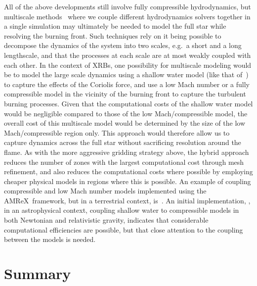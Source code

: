 \documentclass[a4paper]{jpconf}
\newcommand{\amrex}{{\sffamily AMReX}}
\newcommand{\MarginPar}[1]{\marginpar{\vskip-\baselineskip\raggedright\tiny\sffamily\hrule\smallskip{\color{red}#1}\par\smallskip\hrule}}
\begin{document}
All of the above developments still involve fully compressible
hydrodynamics, but multiscale methods~\cite{weinan2011principles} where we couple different hydrodynamics
solvers together in a single simulation may ultimately be needed to model the full star while resolving the burning front.
Such techniques rely on it being possible to decompose the dynamics of the system
into two scales, e.g.~a short and a long lengthscale, and that the processes at each
scale are at most weakly coupled with each other. In the context of XRBs, one possibility for
multiscale modeling would be to model the large scale dynamics using a shallow water model
(like that of~\cite{SPIT_ETAL02}) to capture the effects of the Coriolis force, and use
a low Mach number or
a fully compressible model in the vicinity of the burning front to capture
the turbulent burning processes. Given that the computational costs of the shallow water model
would be negligible compared to those of the low Mach/compressible model, the overall cost of
this multiscale model would be determined by the size of the low Mach/compressible region only. This
approach would therefore allow us to capture dynamics across the full star
without sacrificing resolution around the flame.
As with the more aggressive gridding strategy above, the hybrid approach
reduces the number of zones with the largest computational cost through mesh
refinement, and also reduces the computational costs where possible by
employing cheaper physical models in regions where this is possible.
An example of coupling compressible and low Mach number models implemented using the \amrex~framework, but in a terrestrial context,
is~\cite{Motheau2018}. An initial implementation, \cite{Harpole2018}, in an
astrophysical context, coupling shallow water to compressible models in both
Newtonian and relativistic gravity, indicates that considerable computational
efficiencies are possible, but that close attention to the coupling between the
models is needed.



\section{Summary}
\end{document}
